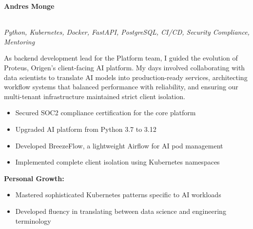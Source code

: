 \documentclass[a4paper,10pt]{article}
\begin{document}
\vspace{0.5cm}
\noindent
{%
	\begin{minipage}{\dimexpr\textwidth-2\fboxsep\relax}
		\vspace{0.2cm}

        \hfill
        {\large\bfseries\color{blue}\selectfont
            A\color{lightblue}ndr\color{blue}e\color{lightblue}s \color{blue}Monge}
		\vspace{0.3cm}

        \noindent\uline{} \\
		\vspace{0.1cm} \hspace{0.2cm}
		{\small\textit{Python, Kubernetes, Docker, FastAPI, PostgreSQL, CI/CD, Security Compliance, Mentoring}}

		As backend development lead for the Platform team, I guided the evolution of Proteus, Origen's client-facing AI platform. My days involved collaborating with data scientists to translate AI models into production-ready services, architecting workflow systems that balanced performance with reliability, and ensuring our multi-tenant infrastructure maintained strict client isolation.

		\vspace{0.2cm}
		\begin{itemize}[label=\textcolor{darkblue}{\textbullet}, leftmargin=*, nosep]
			\item Secured SOC2 compliance certification for the core platform
			\item Upgraded AI platform from Python 3.7 to 3.12
			\item Developed BreezeFlow, a lightweight Airflow for AI pod management
			\item Implemented complete client isolation using Kubernetes namespaces
		\end{itemize}

		\vspace{0.2cm}
		\textbf{Personal Growth:}
		\vspace{0.2cm}
		\begin{itemize}[label=\textcolor{darkblue}{\textbullet}, leftmargin=*, nosep]
			\item Mastered sophisticated Kubernetes patterns specific to AI workloads
			\item Developed fluency in translating between data science and engineering terminology
		\end{itemize}


\end{minipage}}
\end{document}
